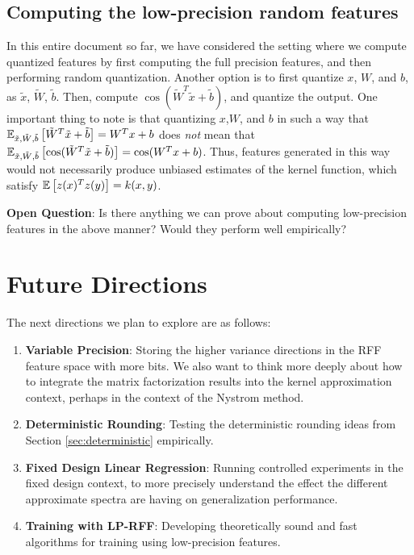 \documentclass[12pt]{article}
\newcommand{\sq}{\sqrt{2}}
\newcommand{\tx}{\tilde{x}}
\newcommand{\tW}{\tilde{W}}
\newcommand{\tb}{\tilde{b}}
\newcommand{\teps}{\tilde{\epsilon}}
\newcommand{\tS}{\tilde{S}}
\begin{document}
\subsection{Computing the low-precision random features}
In this entire document so far, we have considered the setting where we compute quantized features by first computing the full precision features, and then performing random quantization.  Another option is to 
first quantize $x$, $W$, and $b$, as $\tx$, $\tW$, $\tb$.  Then, compute $\cos(\tW^T \tx + \tb)$, and quantize the output.
One important thing to note is that quantizing $x$,$W$, and $b$ in such a way that $\expect{\tx,\tW,\tb}{\tW^T\tx + \tb} = W^Tx+b$ does \textit{not} mean that $\expect{\tx,\tW,\tb}{\cos(\tW^T\tx + \tb)} = \cos(W^Tx + b)$.  Thus, features generated in this way would not necessarily produce unbiased estimates of the kernel function, which satisfy $\expect{}{z(x)^Tz(y)} = k(x,y)$.

\noindent \textbf{Open Question}: Is there anything we can prove about computing low-precision features in the above manner? Would they perform well empirically?



\section{Future Directions}
\label{sec:future}
The next directions we plan to explore are as follows:
\begin{enumerate}
\item \textbf{Variable Precision}:  Storing the higher variance directions in the RFF feature space with more bits.  We also want to think more deeply about how to integrate the matrix factorization results into the kernel approximation context, perhaps in the context of the Nystrom method.
\item \textbf{Deterministic Rounding}: Testing the deterministic rounding ideas from Section \ref{sec:deterministic} empirically.
\item \textbf{Fixed Design Linear Regression}: Running controlled experiments in the fixed design context, to more precisely understand the effect the different approximate spectra are having on generalization performance.
\item \textbf{Training with LP-RFF}: Developing theoretically sound and fast algorithms for training using low-precision features.
\end{enumerate}
\end{document}
